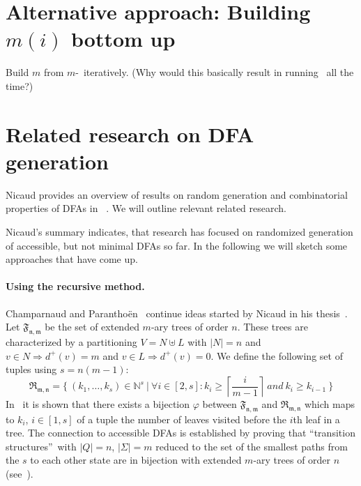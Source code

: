 \section{Alternative approach: Building $m(i)$ bottom up}

Build $m$ from $m$-\CompDist\ iteratively. (Why would this basically result in running \CompDist\ all the time?)

\section{Related research on DFA generation}

Nicaud provides an overview of results on random generation and combinatorial properties of DFAs in ~\cite{Nic14}. We will outline relevant related research.


Nicaud's summary indicates, that research has focused on randomized generation of accessible, but not minimal DFAs so far. In the following we will sketch some approaches that have come up.

\paragraph*{Using the recursive method.}

Champarnaud and Paranthoën~\cite{CP05} continue ideas started by Nicaud in his thesis~\cite{Nic00}. Let $\mathfrak{F_{n,m}}$ be the set of extended $m$-ary trees of order $n$. These trees are characterized by a partitioning $V = N \uplus L$ with $|N| = n$ and $v \in N \Rightarrow d^+(v) = m$ and $v \in L \Rightarrow d^+(v) = 0$. We define the following set of tuples using $s=n(m-1)$:
\[
    \mathfrak{R_{m,n}} = \{\ (k_1,\ldots,k_s) \in \mathbb{N}^s\ |\ \forall i\in [2,s]\colon k_i \geq \left\lceil\frac{i}{m-1}\right\rceil\ and\ k_i \geq k_{i-1}\ \}
\]
In~\cite[p. 6]{CP05} it is shown that there exists a bijection $\varphi$ between $\mathfrak{F_{n,m}}$ and $\mathfrak{R_{m,n}}$ which maps to $k_i$, $i\in[1,s]$ of a tuple the number of leaves visited before the $i$th leaf in a tree. The connection to accessible DFAs is established by proving that  ``transition structures\footnotemark''\ with $|Q|=n$, $|\Sigma|=m$ reduced to the set of the smallest paths from the $s$ to each other state are in bijection with extended $m$-ary trees of order $n$ (see~\cite[p. 8]{CP05}).

